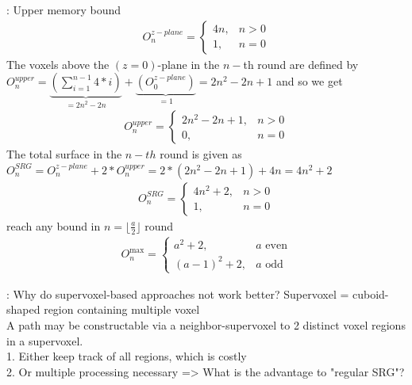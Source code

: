 \documentclass{beamer}
\newcommand{\floor}[1]{\lfloor #1 \rfloor}
\begin{document}
\begin{frame}{\insertsection : Upper memory bound}
  \scriptsize
\begin{align}
  O_n^{z-plane} = \begin{cases}
    4n, &n>0\\
    1,  &n=0
  \end{cases}\label{eq:zplane}
\end{align}
The voxels above the $(z=0)$-plane in the $n-$th round are defined by $O_n^{upper} = \underbrace{(\sum_{i=1}^{n-1} 4*i)}_{=2n^2-2n} + \underbrace{(O_0^{z-plane})}_{= 1} = 2n^2 -2n +1$ and so we get
\begin{align}
  O_n^{upper} =
    \begin{cases} 2n^2 -2n +1, &n>0 \\
                            0, &n=0
    \end{cases}\label{eq:upper}
\end{align}
The total surface in the $n-th$ round is given as $O_n^{SRG} = O_n^{z-plane} + 2*O_n^{upper} = 2*(2n^2 -2n +1) + 4n = 4n^2 + 2$
\begin{align}
  O_n^{SRG} = \begin{cases}
    4n^2 + 2, &n>0 \\
           1, &n=0
  \end{cases}\label{eq:total}
\end{align}
reach any bound in $n=\floor{\frac{a}{2}}$ round
\begin{align}
  O^\text{max}_n = \begin{cases}
    a^2+2, &a \text{ even}\\
    (a-1)^2+2, &a \text{ odd}
  \end{cases}\label{eq:octahedron}
\end{align}
\end{frame}
\begin{frame}{\insertsection : Why do supervoxel-based approaches not work better?}
  Supervoxel = cuboid-shaped region containing multiple voxel\\
  A path may be constructable via a neighbor-supervoxel to 2 distinct voxel regions in a supervoxel.\\
  1. Either keep track of all regions, which is costly\\
  2. Or multiple processing necessary => What is the advantage to "regular SRG"?
\end{frame}
\end{document}
